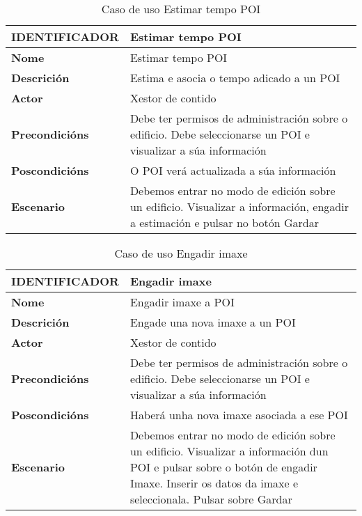 \begin{table}[tbp]
	\begin{tabular}{|l|p{10cm}|}
		\hline 
		\textbf{IDENTIFICADOR}	& \textbf{Estimar tempo POI} \\ 
		\hline 
		\textbf{Nome} & Estimar tempo POI \\ 
		\hline 
		\textbf{Descrición} & Estima e asocia o tempo adicado a un POI \\ 
		\hline 
		\textbf{Actor} & Xestor de contido \\ 
		\hline 
		\textbf{Precondicións} & Debe ter permisos de administración sobre o edificio. Debe seleccionarse un POI e visualizar a súa información \\ 
		\hline 
		\textbf{Poscondicións} & O POI verá actualizada a súa información \\ 
		\hline 
		\textbf{Escenario} & Debemos entrar no modo de edición sobre un edificio. Visualizar a información, engadir a estimación e pulsar no botón Gardar \\ 
		\hline 
	\end{tabular}
	\caption{Caso de uso Estimar tempo POI}
	\label{tab:cuEstimarTempoPOI}
\end{table}

\begin{table}[tbp]
	\begin{tabular}{|l|p{10cm}|}
		\hline 
		\textbf{IDENTIFICADOR}	& \textbf{Engadir imaxe} \\ 
		\hline 
		\textbf{Nome} & Engadir imaxe a POI \\ 
		\hline 
		\textbf{Descrición} & Engade una nova imaxe a un POI \\ 
		\hline 
		\textbf{Actor} & Xestor de contido \\ 
		\hline 
		\textbf{Precondicións} & Debe ter permisos de administración sobre o edificio. Debe seleccionarse un POI e visualizar a súa información \\ 
		\hline 
		\textbf{Poscondicións} & Haberá unha nova imaxe asociada a ese POI \\ 
		\hline 
		\textbf{Escenario} & Debemos entrar no modo de edición sobre un edificio. Visualizar a información dun POI e pulsar sobre o botón de engadir Imaxe. Inserir os datos da imaxe e seleccionala. Pulsar sobre Gardar \\ 
		\hline 
	\end{tabular}
	\caption{Caso de uso Engadir imaxe}
	\label{tab:cuEngadirImaxe}
\end{table}

